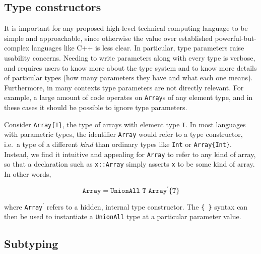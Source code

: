 \subsection{Type constructors}

It is important for any proposed high-level technical computing language to be
simple and approachable, since otherwise the value over established
powerful-but-complex languages like C++ is less clear.
In particular, type parameters raise usability concerns.
Needing to write parameters along with every type is verbose, and requires users
to know more about the type system and to know more details of particular
types (how many parameters they have and what each one means).
Furthermore, in many contexts type parameters are not directly relevant.
For example, a large amount of code operates on \texttt{Array}s of any
element type, and in these cases it should be possible to ignore type parameters.

Consider \texttt{Array\{T\}}, the type of arrays with element type \texttt{T}.
In most languages with parametric types, the identifier \texttt{Array} would
refer to a type constructor, i.e.\ a type of a different \emph{kind} than
ordinary types like \texttt{Int} or \texttt{Array\{Int\}}.
Instead, we find it intuitive and appealing for \texttt{Array} to refer to
any kind of array, so that a declaration such as \texttt{x::Array} simply
asserts \texttt{x} to be some kind of array.
In other words,

\vspace{-3ex}
\[
\texttt{Array} = \texttt{UnionAll T Array$^\prime$\{T\}}
\]

\noindent
where \texttt{Array$^\prime$} refers to a hidden, internal type constructor.
The \texttt{\{ \}} syntax can then be used to instantiate a \texttt{UnionAll}
type at a particular parameter value.


\subsection{Subtyping}
\label{sec:subtyping}

